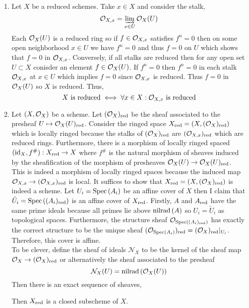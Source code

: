\documentclass[12pt]{article}
\begin{document}
\begin{enumerate}
\item 
Let $X$ be a reduced schemes. Take $x \in X$ and consider the stalk,
\[ \mathcal{O}_{X, x} = \varinjlim_{x \in U} \mathcal{O}_{X}(U) \]
Each $\mathcal{O}_{X}(U)$ is a reduced ring so if $f \in \mathcal{O}_{X, x}$ satisfies $f^n = 0$ then on some open neighborhood $x \in U$ we have $f^n = 0$ and thus $f = 0$ on $U$ which shows that $f = 0$ in $\mathcal{O}_{X, x}$. Conversely, if all stalks are reduced then for any open set $U \subset X$ conisder an element $f \in \mathcal{O}_{X}(U)$. If $f^n = 0$ then $f^n = 0$ in each stalk $\mathcal{O}_{X, x}$ at $x \in U$ which implies $f = 0$ since $\mathcal{O}_{X, x}$ is reduced. Thus $f = 0$ in $\mathcal{O}_{X}(U)$ so $X$ is reduced. Thus,
\[ X \text{ is reduced} \iff \forall x \in X : \mathcal{O}_{X, x} \text{ is reduced} \]

\item Let $(X, \mathcal{O}_{X})$ be a scheme. Let $(\mathcal{O}_{X})_{\mathrm{red}}$ be the sheaf associated to the presheaf $U \mapsto \mathcal{O}_{X}(U)_{\mathrm{red}}$. Consider the ringed space $X_{\mathrm{red}} = (X, (\mathcal{O}_{X})_{\mathrm{red}})$ which is locally ringed because the stalks of $(\mathcal{O}_{X})_{\mathrm{red}}$ are $(\mathcal{O}_{X, x})_{\mathrm{red}}$ which are reduced rings. Furthermore, there is a morphism of locally ringed spaced $(\mathrm{id}_X, f^\#) : X_{\mathrm{red}} \to X$ where $f^\#$ is the natural morphism of sheaves induced by the sheafification of the morphism of presheaves $\mathcal{O}_{X}(U) \to \mathcal{O}_{X}(U)_{\mathrm{red}}$. This is indeed a morphism of locally ringed spaces because the induced map $\mathcal{O}_{X, x} \to (\mathcal{O}_{X, x})_{\mathrm{red}}$ is local. It suffices to show that $X_{\mathrm{red}} = (X, (\mathcal{O}_{X})_{\mathrm{red}})$ is indeed a scheme. Let $U_i = \mathrm{Spec}\left( A_i \right)$ be an affine cover of $X$ then I claim that $\tilde{U}_i = \mathrm{Spec}\left( (A_i)_{\mathrm{red}} \right)$ is an affine cover of $X_{\mathrm{red}}$. Firstly, $A$ and $A_{\mathrm{red}}$ have the same prime ideals because all primes lie above $\mathrm{nilrad}\left( A \right)$ so $U_i = \tilde{U}_i$ as topological spaces. Furthermore, the structure sheaf $\mathcal{O}_{\mathrm{Spec}\left( (A_i)_{\mathrm{red}} \right)}$ has exactly the correct structure to be the unique sheaf $(\mathcal{O}_{\mathrm{Spec}\left( A_i \right)})_{\mathrm{red}} = (\mathcal{O}_{X})_{\mathrm{red}}|_{U_i}$. Therefore, this cover is affine. 
\bigskip\\
To be clever, define the sheaf of ideals $\mathcal{N}_X$ to be the kernel of the sheaf map $\mathcal{O}_{X} \to (\mathcal{O}_{X})_{\mathrm{red}}$ or alternatively the sheaf associated to the presheaf 
\[ \mathcal{N}_X(U) = \mathrm{nilrad}\left( \mathcal{O}_{X}(U) \right) \] 
Then there is an exact sequence of sheaves,
\begin{center}
\end{center}
Then $X_{\mathrm{red}}$ is a closed subscheme of $X$. 


\end{enumerate}
\end{document}

